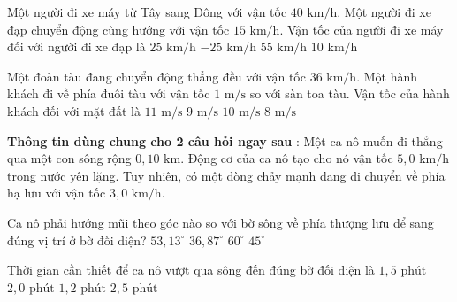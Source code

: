 \begin{ex}
Một người đi xe máy từ Tây sang Đông với vận tốc $40\text{ km/h}$. Một người đi xe đạp chuyển động cùng hướng với vận tốc $15\text{ km/h}$. Vận tốc của người đi xe máy đối với người đi xe đạp là
\choice
{\True $25\text{ km/h}$}
{$-25\text{ km/h}$}
{$55\text{ km/h}$}
{$10\text{ km/h}$}
\end{ex}

\begin{ex}
Một đoàn tàu đang chuyển động thẳng đều với vận tốc $36\text{ km/h}$. Một hành khách đi về phía đuôi tàu với vận tốc $1\text{ m/s}$ so với sàn toa tàu. Vận tốc của hành khách đối với mặt đất là
\choice
{$11\text{ m/s}$}
{\True $9\text{ m/s}$}
{$10\text{ m/s}$}
{$8\text{ m/s}$}
\end{ex}

\noindent\textbf{Thông tin dùng chung cho 2 câu hỏi ngay sau} : Một ca nô muốn đi thẳng qua một con sông rộng $0{,}10\text{ km}$. Động cơ của ca nô tạo cho nó vận tốc $5{,}0\text{ km/h}$ trong nước yên lặng. Tuy nhiên, có một dòng chảy mạnh đang di chuyển về phía hạ lưu với vận tốc $3{,}0\text{ km/h}$.

\begin{ex}
Ca nô phải hướng mũi theo góc nào so với bờ sông về phía thượng lưu để sang đúng vị trí ở bờ đối diện?
\choice
{\True $53{,}13^\circ$}
{$36{,}87^\circ$}
{$60^\circ$}
{$45^\circ$}
\end{ex}

\begin{ex}
Thời gian cần thiết để ca nô vượt qua sông đến đúng bờ đối diện là
\choice
{\True $1{,}5\text{ phút}$}
{$2{,}0\text{ phút}$}
{$1{,}2\text{ phút}$}
{$2{,}5\text{ phút}$}
\end{ex}

